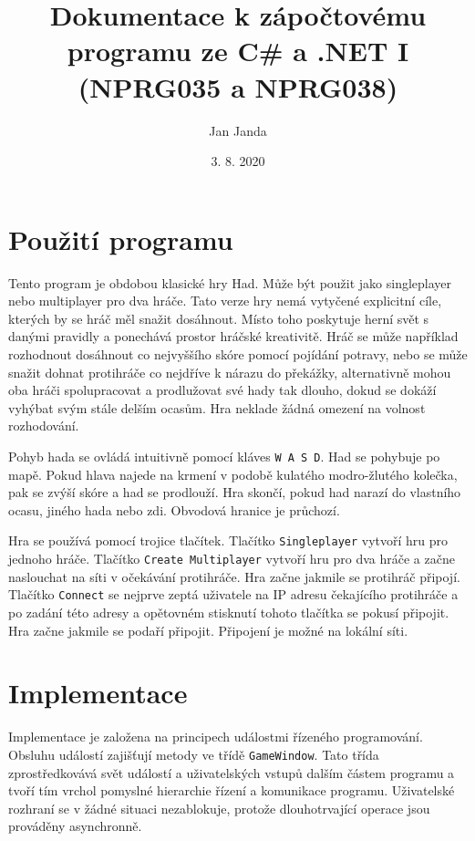 \documentclass[12pt]{article}
\title{Dokumentace k zápočtovému programu ze C\# a .NET I (NPRG035 a NPRG038)}
\date{3. 8. 2020}
\author{Jan Janda}
\begin{document}
 \maketitle
 
 \section*{Použití programu}

 Tento program je obdobou klasické hry Had. Může být použit jako singleplayer nebo multiplayer pro dva hráče. Tato verze hry nemá vytyčené explicitní cíle, kterých by se hráč měl snažit dosáhnout. Místo toho poskytuje herní svět s danými pravidly a ponechává prostor hráčské kreativitě. Hráč se může například rozhodnout dosáhnout co nejvyššího skóre pomocí pojídání potravy, nebo se může snažit dohnat protihráče co nejdříve k nárazu do překážky, alternativně mohou oba hráči spolupracovat a prodlužovat své hady tak dlouho, dokud se dokáží vyhýbat svým stále delším ocasům. Hra neklade žádná omezení na volnost rozhodování.
 
 Pohyb hada se ovládá intuitivně pomocí kláves \texttt{W A S D}. Had se pohybuje po mapě. Pokud hlava najede na krmení v podobě kulatého modro-žlutého kolečka, pak se zvýší skóre a had se prodlouží. Hra skončí, pokud had narazí do vlastního ocasu, jiného hada nebo zdi. Obvodová hranice je průchozí.
 
 Hra se používá pomocí trojice tlačítek. Tlačítko \texttt{Singleplayer} vytvoří hru pro jednoho hráče. Tlačítko \texttt{Create Multiplayer} vytvoří hru pro dva hráče a začne naslouchat na síti v očekávání protihráče. Hra začne jakmile se protihráč připojí. Tlačítko \texttt{Connect} se nejprve zeptá uživatele na IP adresu čekajícího protihráče a po zadání této adresy a opětovném stisknutí tohoto tlačítka se pokusí připojit. Hra začne jakmile se podaří připojit. Připojení je možné na lokální síti.
 
 \section*{Implementace}
 
 Implementace je založena na principech událostmi řízeného programování. Obsluhu událostí zajišťují metody ve třídě \texttt{GameWindow}. Tato třída zprostředkovává svět událostí a uživatelských vstupů dalším částem programu a tvoří tím vrchol pomyslné hierarchie řízení a komunikace programu. Uživatelské rozhraní se v žádné situaci nezablokuje, protože dlouhotrvající operace jsou prováděny asynchronně.
 
\end{document}
